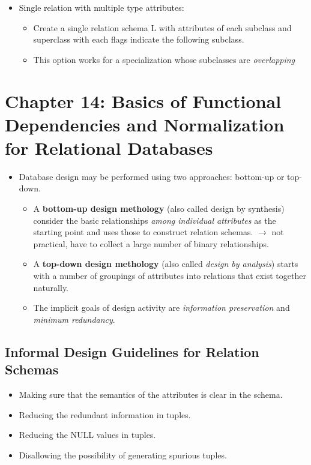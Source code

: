 \documentclass[10pt]{article}
\newcommand{\tf}{\textbf}
\newcommand{\ti}{\textit}
\newcommand{\rarrow}{\rightarrow}
\begin{document}
\begin{enumerate}
\begin{itemize}
\begin{itemize}
\begin{itemize}
				\item Single relation with multiple type attributes:
				\begin{itemize}
					\item Create a single relation schema L with attributes of each subclass and superclass with each flags indicate the following subclass.
					\item This option works for a specialization whose subclasses are \ti{overlapping} 
				\end{itemize}
			\end{itemize}  
		\end{itemize}
	\end{itemize}
\end{enumerate}

\section{Chapter 14: Basics of Functional Dependencies and Normalization for Relational Databases}

\begin{itemize}
	\item Database design may be performed using two approaches: bottom-up or top-down.
	
	\begin{itemize}
		\item A \tf{bottom-up design methology} (also called design by synthesis) consider the basic relationships \ti{among individual attributes} as the starting point and uses those to construct relation schemas. $\rarrow$ not practical, have to collect a large number of binary relationships.
		
		\item A \tf{top-down design methology} (also called \ti{design by analysis}) starts with a number of groupings of attributes into relations that exist together naturally.
		
		\item The implicit goals of design activity are \ti{information preservation} and \ti{minimum redundancy}.
	\end{itemize}
\end{itemize}

\subsection{Informal Design Guidelines for Relation Schemas}

\begin{itemize}
	\item Making sure that the semantics of the attributes is clear in the schema.
	\item Reducing the redundant information in tuples.
	\item Reducing the NULL values in tuples.
	\item Disallowing the possibility of generating spurious tuples. 
\end{itemize}
\end{document}
